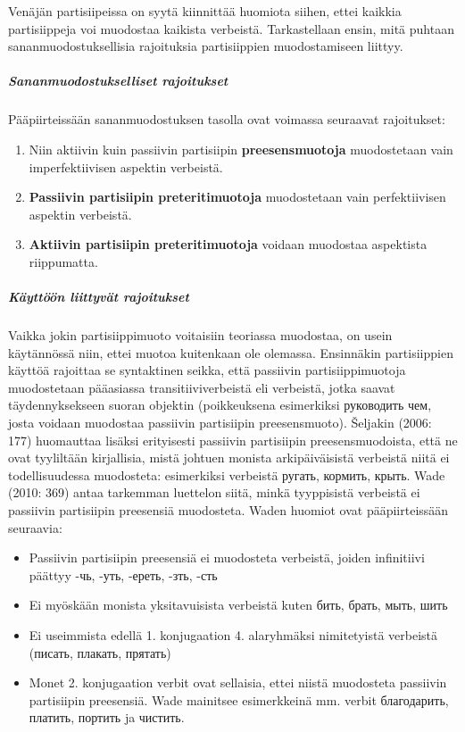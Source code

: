 \documentclass[]{scrartcl}
\providecommand{\tightlist}{%
  \setlength{\itemsep}{0pt}\setlength{\parskip}{0pt}}
\begin{document}
Venäjän partisiipeissa on syytä kiinnittää huomiota siihen, ettei
kaikkia partisiippeja voi muodostaa kaikista verbeistä. Tarkastellaan
ensin, mitä puhtaan sananmuodostuksellisia rajoituksia partisiippien
muodostamiseen liittyy.

\subparagraph{Sananmuodostukselliset
rajoitukset}\label{sananmuodostukselliset-rajoitukset}

Pääpiirteissään sananmuodostuksen tasolla ovat voimassa seuraavat
rajoitukset:

\begin{enumerate}
\def\labelenumi{\arabic{enumi}.}
\tightlist
\item
  Niin aktiivin kuin passiivin partisiipin \textbf{preesensmuotoja}
  muodostetaan vain imperfektiivisen aspektin verbeistä.
\item
  \textbf{Passiivin partisiipin preteritimuotoja} muodostetaan vain
  perfektiivisen aspektin verbeistä.
\item
  \textbf{Aktiivin partisiipin preteritimuotoja} voidaan muodostaa
  aspektista riippumatta.
\end{enumerate}

\subparagraph{Käyttöön liittyvät
rajoitukset}\label{kuxe4yttuxf6uxf6n-liittyvuxe4t-rajoitukset}

Vaikka jokin partisiippimuoto voitaisiin teoriassa muodostaa, on usein
käytännössä niin, ettei muotoa kuitenkaan ole olemassa. Ensinnäkin
partisiippien käyttöä rajoittaa se syntaktinen seikka, että passiivin
partisiippimuotoja muodostetaan pääasiassa transitiiviverbeistä eli
verbeistä, jotka saavat täydennyksekseen suoran objektin (poikkeuksena
esimerkiksi руководить чем, josta voidaan muodostaa passiivin
partisiipin preesensmuoto). Šeljakin (2006: 177) huomauttaa lisäksi
erityisesti passiivin partisiipin preesensmuodoista, että ne ovat
tyyliltään kirjallisia, mistä johtuen monista arkipäiväisistä verbeistä
niitä ei todellisuudessa muodosteta: esimerkiksi verbeistä ругать,
кормить, крыть. Wade (2010: 369) antaa tarkemman luettelon siitä, minkä
tyyppisistä verbeistä ei passiivin partisiipin preesensiä muodosteta.
Waden huomiot ovat pääpiirteissään seuraavia:

\begin{itemize}
\tightlist
\item
  Passiivin partisiipin preesensiä ei muodosteta verbeistä, joiden
  infinitiivi päättyy -чь, -уть, -ереть, -зть, -сть
\item
  Ei myöskään monista yksitavuisista verbeistä kuten бить, брать, мыть,
  шить
\item
  Ei useimmista edellä 1. konjugaation 4. alaryhmäksi nimitetyistä
  verbeistä (писать, плакать, прятать)
\item
  Monet 2. konjugaation verbit ovat sellaisia, ettei niistä muodosteta
  passiivin partisiipin preesensiä. Wade mainitsee esimerkkeinä mm.
  verbit благодарить, платить, портить ja чистить.
\end{itemize}
\end{document}
